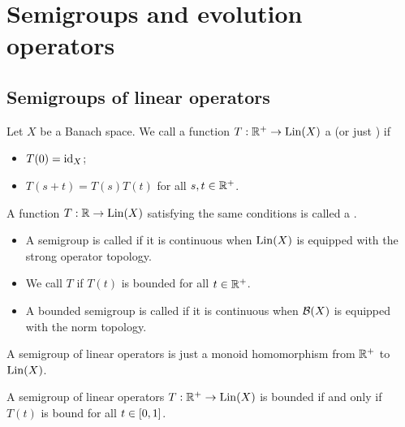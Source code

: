 \chapter{Semigroups and evolution operators}
\section{Semigroups of linear operators}
\begin{definition}
Let $X$ be a Banach space. We call a function $T: \mathbb{R}^+ \to \operatorname{Lin}(X)$ a  (or just ) if
\begin{itemize}
\item $T(0) = \operatorname{id}_X$;
\item $T(s+t) = T(s)T(t)$ for all $s,t \in \mathbb{R}^+$.
\end{itemize}
A function $T: \mathbb{R} \to \operatorname{Lin}(X)$ satisfying the same conditions is called a .
\begin{itemize}
\item A semigroup is called  if it is continuous when $\operatorname{Lin}(X)$ is equipped with the strong operator topology.
\item We call $T$  if $T(t)$ is bounded for all $t\in \mathbb{R}^+$.
\item A bounded semigroup is called  if it is continuous when $\operatorname{\mathcal{B}}(X)$ is equipped with the norm topology.
\end{itemize}
\end{definition}
A semigroup of linear operators is just a monoid homomorphism from $\mathbb{R}^+$ to $\operatorname{Lin}(X)$.

\begin{lemma}
A semigroup of linear operators $T:\mathbb{R}^+\to \operatorname{Lin}(X)$ is bounded \textup{if and only if} $T(t)$ is bound for all $t\in \interval{0,1}$.
\end{lemma}

